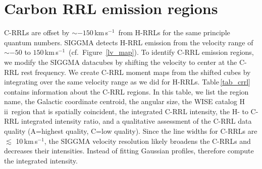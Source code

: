 \documentclass[manuscript]{aastex61}
\newcommand{\hii}{{\rm H\,}{{\sc ii}}}
\newcommand{\kms}{\,km\,s$^{-1}$}
\begin{document}
\section{Carbon RRL emission regions} \label{sec_crrl}
C-RRLs are offset by $\sim-150$\kms\ from H-RRLs for the same principle quantum numbers.
SIGGMA detects H-RRL emission from the velocity range of $\sim -50$ to $150$\kms\ (cf.~Figure~\ref{lv_map}).
To identify C-RRL emission regions, we modify the SIGGMA datacubes by shifting the velocity to center at the C-RRL rest frequency.
We create C-RRL moment maps from the shifted cubes by integrating over the same velocity range as we did for H-RRLs.
Table\,\ref{tab_crrl} contains information about the C-RRL regions. %
In this table, we list the region name,
the Galactic coordinate centroid, the angular size, the WISE catalog \hii\ region that is spatially coincident, the integrated C-RRL intensity, the H- to C-RRL integrated intensity ratio, and a qualitative assessment of the C-RRL data quality (A=highest quality, C=low quality).
Since the line widths for C-RRLs are $\lesssim$ 10\kms, the SIGGMA velocity resolution likely broadens the C-RRLs and decreases their intensities.
Instead of fitting Gaussian profiles, therefore compute the integrated intensity.
\end{document}
